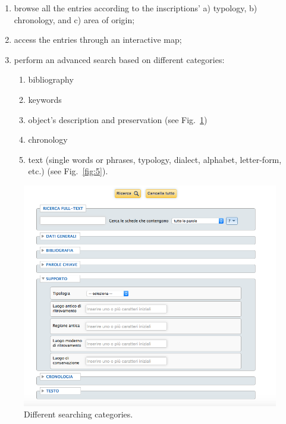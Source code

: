 \documentclass[amsthm,ebook]{saparticle}
\begin{document}
\begin{enumerate}
\renewcommand{\theenumi}{\alph{enumi}}
\item browse all the entries according to the inscriptions’ a) typology, b) chronology, and c) area of origin;
\item access the entries through an interactive map;
\item perform an advanced search based on different categories: 
\begin{enumerate}
\renewcommand{\theenumi}{\alph{enumi}}
\item bibliography
\item keywords
\item object’s description and preservation (see Fig.~\ref{fig:4})
\item chronology
\item text (single words or phrases, typology, dialect, alphabet, letter-form, etc.) (see Fig.~\ref{fig:5}).
\end{enumerate}
\end{enumerate}







\begin{figure}[!hbp]
\centering
 \includegraphics[width=\columnwidth]{EAGLE2016FullPaperrevised-img004.png}
\caption{Different searching categories.}
\label{fig:4}
\end{figure}
\end{document}
